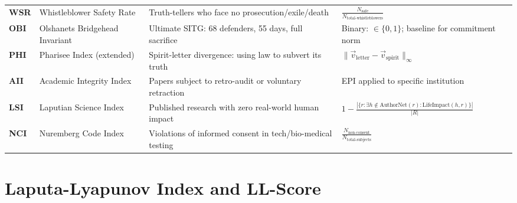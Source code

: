 \documentclass[11pt,a4paper]{article}
\theoremstyle{definition}
\theoremstyle{remark}
\begin{document}
\begin{longtable}{@{}p{}p{}
  p{}p{}@{}}
\textbf{WSR} & Whistleblower Safety Rate &
  Truth-tellers who face no prosecution/exile/death &
  $\frac{N_\text{safe}}{N_\text{total-whistleblowers}}$ \\[4pt]

\textbf{OBI} & Olshanets Bridgehead Invariant &
  Ultimate SITG: 68 defenders, 55 days, full sacrifice &
  Binary: $\in \{0,1\}$; baseline for commitment norm \\[4pt]

\textbf{PHI} & Pharisee Index (extended) &
  Spirit-letter divergence: using law to subvert its truth &
  $\|\vec{v}_\text{letter} - \vec{v}_\text{spirit}\|_\infty$ \\[4pt]

\textbf{AII} & Academic Integrity Index &
  Papers subject to retro-audit or voluntary retraction &
  EPI applied to specific institution \\[4pt]

\textbf{LSI} & Laputian Science Index &
  Published research with zero real-world human impact &
  $1 - \frac{|\{r: \exists h \notin \text{AuthorNet}(r): \text{LifeImpact}(h,r)\}|}{|R|}$ \\[4pt]

\textbf{NCI} & Nuremberg Code Index &
  Violations of informed consent in tech/bio-medical testing &
  $\frac{N_\text{non-consent}}{N_\text{total-subjects}}$ \\

\end{longtable}

\section{Laputa-Lyapunov Index and LL-Score}
\label{app:laputa}
\end{document}
